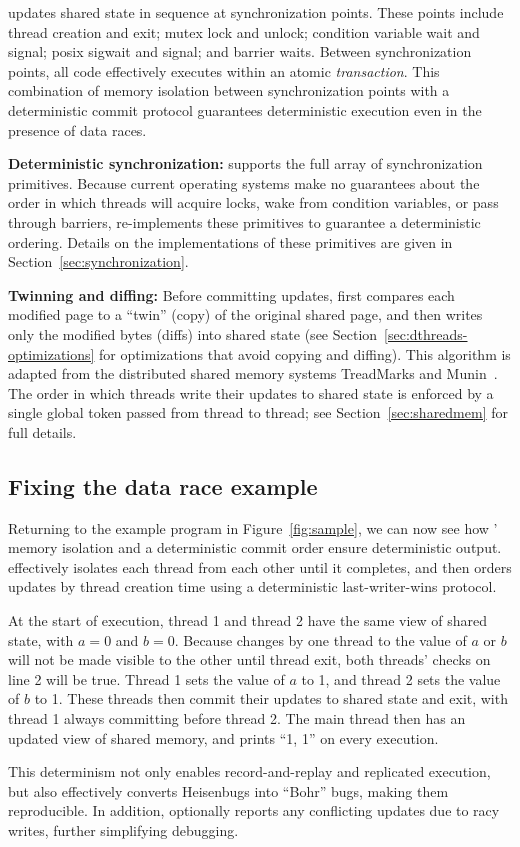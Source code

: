 \dthreads{} updates shared
state in sequence at synchronization points. These points
include thread creation and exit; mutex lock and unlock; condition
variable wait and signal; posix sigwait and signal; and barrier waits. Between
synchronization points, all code effectively executes within an
atomic \emph{transaction}. This combination of memory isolation between
synchronization points with a deterministic commit protocol guarantees
deterministic execution even in the presence of data races.

\textbf{Deterministic synchronization:}
\dthreads{} supports the full array of \pthreads{} synchronization
primitives.  Because current operating systems make no guarantees about the
order in which threads will acquire locks, wake from condition
variables, or pass through barriers, \dthreads{} re-implements these
primitives to guarantee a deterministic ordering.
Details on the \dthreads{} implementations of these primitives are
given in Section~\ref{sec:synchronization}.

\textbf{Twinning and diffing:}
Before committing updates, \dthreads{} first compares each modified
page to a ``twin'' (copy) of the original shared page, and then writes
only the modified bytes (diffs) into shared state (see
Section~\ref{sec:dthreads-optimizations} for optimizations that avoid
copying and diffing).  This algorithm is adapted from the distributed
shared memory systems TreadMarks and
Munin~\cite{dsm:munin,dsm:treadmarks}. The order in which threads
write their updates to shared state is enforced by a single global
token passed from thread to thread; see
Section~\ref{sec:sharedmem} for full details.


\subsection*{Fixing the data race example}
Returning to the example program in Figure~\ref{fig:sample}, we can
now see how \dthreads{}' memory isolation and a deterministic
commit order ensure deterministic output. \dthreads{} effectively
isolates each thread from each other until it completes, and then
orders updates by thread creation time using a deterministic
last-writer-wins protocol.

At the start of execution, thread 1 and thread 2 have the same view of
shared state, with $a = 0$ and $b = 0$.  Because changes by one thread
to the value of $a$ or $b$ will not be made visible to the other until
thread exit, both threads' checks on line 2 will be true.  Thread 1
sets the value of $a$ to 1, and thread 2 sets the value of $b$ to 1.
These threads then commit their updates to shared state and exit, with
thread 1 always committing before thread 2.  The main thread then has
an updated view of shared memory, and prints ``1, 1'' on every
execution.

This determinism not only enables record-and-replay and replicated
execution, but also effectively converts Heisenbugs into ``Bohr''
bugs, making them reproducible. In addition, \dthreads{} optionally
reports any conflicting updates due to racy writes, further
simplifying debugging.

